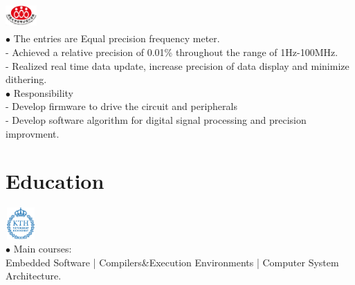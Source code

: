 \documentclass[12pt,a4paper,sans]{moderncv}        %
\begin{document}
\includegraphics[width=1.2cm,height=1cm]{NUEDC.jpg} \vspace{-25pt}\\
\hspace*{1.3cm} 
{
\hspace*{1.3cm} $\bullet$ The entries are Equal precision frequency meter.  \\
\hspace*{1.37cm} - Achieved a relative precision of 0.01\% throughout the range of 1Hz-100MHz.\\
\hspace*{1.37cm} - Realized real time data update, increase precision of data display and minimize dithering.\vspace{3pt}\\
\hspace*{1.3cm} $\bullet$ Responsibility\\
\hspace*{1.37cm} - Develop firmware to drive the circuit and peripherals\\
\hspace*{1.37cm} - Develop software algorithm for digital signal processing and precision improvment.
}

 
\section{Education}
\includegraphics[width=1.15cm,height=1.2cm]{kth.png} \vspace{-25pt}\\
\hspace*{1.3cm}
{
\hspace*{1cm} $\bullet$ Main courses: \\
\hspace*{1.3cm} Embedded Software | Compilers\&Execution Environments | Computer System Architecture.
}
\end{document}
